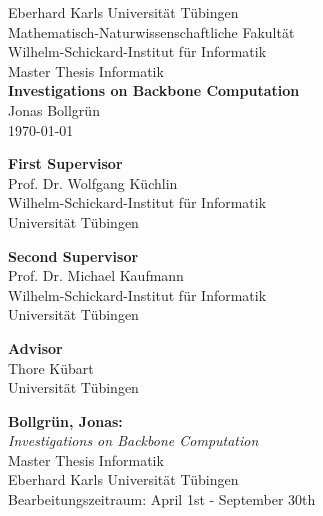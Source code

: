 \begin{titlepage}
 \begin{center}
  {\LARGE Eberhard Karls Universität Tübingen}\\
  {\large Mathematisch-Naturwissenschaftliche Fakultät \\
Wilhelm-Schickard-Institut für Informatik\\[3.5cm]}
  {\huge Master Thesis Informatik\\[2cm]}
  {\Large\bf  Investigations on Backbone Computation\\[1.5cm]}
 {\large Jonas Bollgrün}\\[0.5cm]
	\today \\[2.5cm]

\begin{center}{
\small\bf First Supervisor}\\[0.25cm]
{\large Prof. Dr. Wolfgang Küchlin}\\
  {\footnotesize Wilhelm-Schickard-Institut für Informatik\\
	Universität Tübingen}	
\end{center}
\begin{center}{
\small\bf Second Supervisor}\\[0.25cm]
{\large Prof. Dr. Michael Kaufmann}\\
  {\footnotesize Wilhelm-Schickard-Institut für Informatik\\
	Universität Tübingen}	
\end{center}
	
	
\begin{center}
{\small\bf Advisor}\\[0.25cm]
{\large Thore Kübart}\\
  {
  \footnotesize Universität Tübingen}\end{center}
	
  \end{center}
\end{titlepage}




\thispagestyle{empty}
\vspace*{\fill}
\begin{minipage}{11.2cm}
\textbf{Bollgrün, Jonas:}\\
\emph{Investigations on Backbone Computation}\\
Master Thesis Informatik\\
Eberhard Karls Universität Tübingen\\
Bearbeitungszeitraum: April 1st - September 30th
\end{minipage}
\newpage